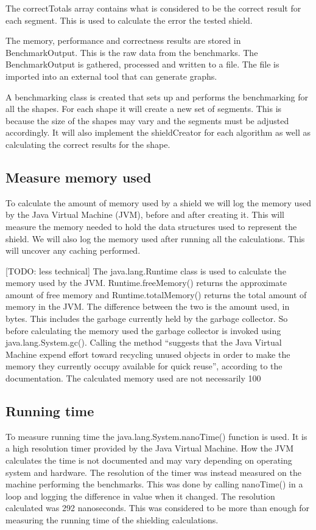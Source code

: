 \documentclass[11pt,twoside,a4paper]{report}
\begin{document}
The correctTotals array contains what is considered to be the correct result for each segment. This is used to calculate the error the tested shield.

The memory, performance and correctness results are stored in BenchmarkOutput. This is the raw data from the benchmarks. The BenchmarkOutput is gathered, processed and written to a file. The file is imported into an external tool that can generate graphs.

A benchmarking class is created that sets up and performs the benchmarking for all the shapes. For each shape it will create a new set of segments. This is because the size of the shapes may vary and the segments must be adjusted accordingly. It will also implement the shieldCreator for each algorithm as well as calculating the correct results for the shape. 

\subsection{Measure memory used}
To calculate the amount of memory used by a shield we will log the memory used by the Java Virtual Machine (JVM), before and after creating it. This will measure the memory needed to hold the data structures used to represent the shield. We will also log the memory used after running all the calculations. This will uncover any caching performed.

[TODO: less technical]
The java.lang.Runtime class is used to calculate the memory used by the JVM. Runtime.freeMemory() returns the approximate amount of free memory and Runtime.totalMemory() returns the total amount of memory in the JVM. The difference between the two is the amount used, in bytes. This includes the garbage currently held by the garbage collector. So before calculating the memory used the garbage collector is invoked using java.lang.System.gc(). Calling the method “suggests that the Java Virtual Machine expend effort toward recycling unused objects in order to make the memory they currently occupy available for quick reuse”, according to the documentation. The calculated memory used are not necessarily 100%

\subsection{Running time}
To measure running time the java.lang.System.nanoTime() function is used. It is a high resolution timer provided by the Java Virtual Machine. How the JVM calculates the time is not documented and may vary depending on operating system and hardware. The resolution of the timer was instead measured on the machine performing the benchmarks. This was done by calling nanoTime() in a loop and logging the difference in value when it changed. The resolution calculated was 292 nanoseconds. This was considered to be more than enough for measuring the running time of the shielding calculations.
\end{document}
